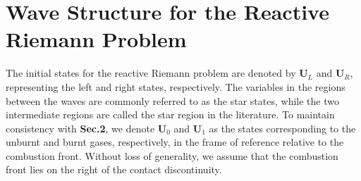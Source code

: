 \section{Wave Structure for the Reactive Riemann Problem}
The initial states for the reactive Riemann problem are denoted by $\boldsymbol{U}_L$ and $\boldsymbol{U}_R$, representing the left and right states, respectively. The variables in the regions between the waves are commonly referred to as the star states, while the two intermediate regions are called the star region in the literature. To maintain consistency with {\bf Sec.2}, we denote $\boldsymbol{U}_0$ and $\boldsymbol{U}_1$ as the states corresponding to the unburnt and burnt gases, respectively, in the frame of reference relative to the combustion front. Without loss of generality, we assume that the combustion front lies on the right of the contact discontinuity.

